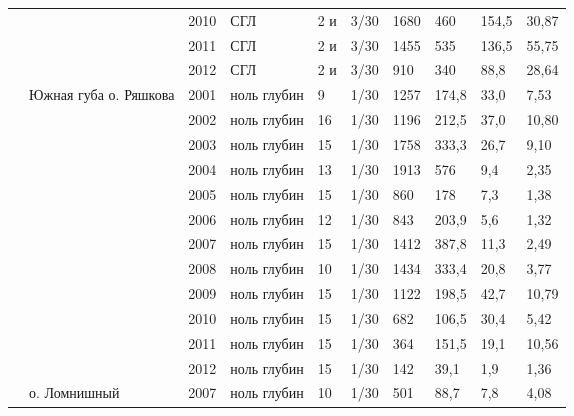 \begin{footnotesize}
\begin{center}
\begin{longtable}{|p{1.6cm}|p{2.3cm}|p{0.8cm}|p{1.8cm}|p{1.1cm}|p{1.1cm}|*{4}{p{1cm}|}}
                   &                                & 2010 & СГЛ               & 2 и  & 3/30 & 1680 & 460    & 154,5 & 30,87 \\
                   &                                & 2011 & СГЛ               & 2 и  & 3/30 & 1455 & 535    & 136,5 & 55,75 \\
                   &                                & 2012 & СГЛ               & 2 и  & 3/30 & 910  & 340    & 88,8  & 28,64 \\\cline{2-10}
                   & Южная губа о. Ряшкова          & 2001 & ноль глубин       & 9    & 1/30 & 1257 & 174,8  & 33,0  & 7,53  \\
                   &                                & 2002 & ноль глубин       & 16   & 1/30 & 1196 & 212,5  & 37,0  & 10,80 \\
                   &                                & 2003 & ноль глубин       & 15   & 1/30 & 1758 & 333,3  & 26,7  & 9,10  \\
                   &                                & 2004 & ноль глубин       & 13   & 1/30 & 1913 & 576    & 9,4   & 2,35  \\
                   &                                & 2005 & ноль глубин       & 15   & 1/30 & 860  & 178    & 7,3   & 1,38  \\
                   &                                & 2006 & ноль глубин       & 12   & 1/30 & 843  & 203,9  & 5,6   & 1,32  \\
                   &                                & 2007 & ноль глубин       & 15   & 1/30 & 1412 & 387,8  & 11,3  & 2,49  \\
                   &                                & 2008 & ноль глубин       & 10   & 1/30 & 1434 & 333,4  & 20,8  & 3,77  \\
                   &                                & 2009 & ноль глубин       & 15   & 1/30 & 1122 & 198,5  & 42,7  & 10,79 \\
                   &                                & 2010 & ноль глубин       & 15   & 1/30 & 682  & 106,5  & 30,4  & 5,42  \\
                   &                                & 2011 & ноль глубин       & 15   & 1/30 & 364  & 151,5  & 19,1  & 10,56 \\
                   &                                & 2012 & ноль глубин       & 15   & 1/30 & 142  & 39,1   & 1,9   & 1,36  \\\cline{2-10}
                   & о. Ломнишный                   & 2007 & ноль глубин       & 10   & 1/30 & 501  & 88,7   & 7,8   & 4,08  \\

\end{longtable}
\end{center}
\end{footnotesize}
